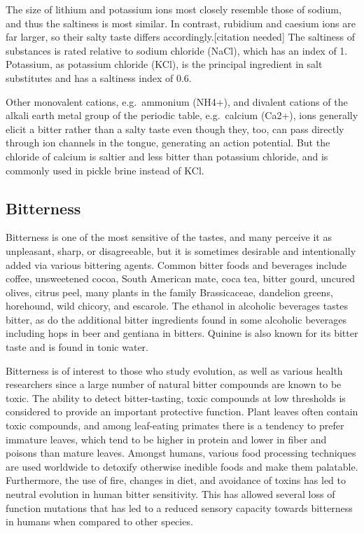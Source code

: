 \documentclass[]{book}
\begin{document}
The size of lithium and potassium ions most closely resemble those of sodium, and thus the saltiness is most similar. In contrast, rubidium and caesium ions are far larger, so their salty taste differs accordingly.{[}citation needed{]} The saltiness of substances is rated relative to sodium chloride (NaCl), which has an index of 1. Potassium, as potassium chloride (KCl), is the principal ingredient in salt substitutes and has a saltiness index of 0.6.

Other monovalent cations, e.g.~ammonium (NH4+), and divalent cations of the alkali earth metal group of the periodic table, e.g.~calcium (Ca2+), ions generally elicit a bitter rather than a salty taste even though they, too, can pass directly through ion channels in the tongue, generating an action potential. But the chloride of calcium is saltier and less bitter than potassium chloride, and is commonly used in pickle brine instead of KCl.

\hypertarget{bitterness}{%
\subsection{Bitterness}\label{bitterness}}

Bitterness is one of the most sensitive of the tastes, and many perceive it as unpleasant, sharp, or disagreeable, but it is sometimes desirable and intentionally added via various bittering agents. Common bitter foods and beverages include coffee, unsweetened cocoa, South American mate, coca tea, bitter gourd, uncured olives, citrus peel, many plants in the family Brassicaceae, dandelion greens, horehound, wild chicory, and escarole. The ethanol in alcoholic beverages tastes bitter, as do the additional bitter ingredients found in some alcoholic beverages including hops in beer and gentiana in bitters. Quinine is also known for its bitter taste and is found in tonic water.

Bitterness is of interest to those who study evolution, as well as various health researchers since a large number of natural bitter compounds are known to be toxic. The ability to detect bitter-tasting, toxic compounds at low thresholds is considered to provide an important protective function. Plant leaves often contain toxic compounds, and among leaf-eating primates there is a tendency to prefer immature leaves, which tend to be higher in protein and lower in fiber and poisons than mature leaves. Amongst humans, various food processing techniques are used worldwide to detoxify otherwise inedible foods and make them palatable. Furthermore, the use of fire, changes in diet, and avoidance of toxins has led to neutral evolution in human bitter sensitivity. This has allowed several loss of function mutations that has led to a reduced sensory capacity towards bitterness in humans when compared to other species.
\end{document}
